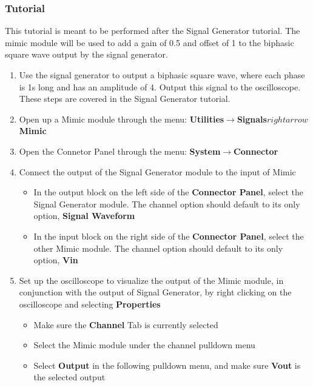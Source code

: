 \subsubsection{Tutorial}
\label{mimic tutorial}
This tutorial is meant to be performed after the Signal Generator tutorial. The mimic module will be used to add a gain of 0.5 and offset of 1 to the biphasic square wave output by the signal generator.

\begin{enumerate}
\item Use the signal generator to output a biphasic square wave, where each phase is 1s long and has an amplitude of 4. Output this signal to the oscilloscope. These steps are covered in the Signal Generator tutorial. 
\item Open up a Mimic module through the menu: \textbf{Utilities}$\rightarrow$\textbf{Signals}$rightarrow$\textbf{Mimic}
\item Open the Connetor Panel through the menu: \textbf{System}$\rightarrow$\textbf{Connector}
\item Connect the output of the Signal Generator module to the input of Mimic
  \begin{itemize}
  \item In the output block on the left side of the \textbf{Connector Panel}, select the Signal Generator module. The channel option should default to its only option, \textbf{Signal Waveform}
  \item In the input block on the right side of the \textbf{Connector Panel}, select the other Mimic module. The channel option should default to its only option, \textbf{Vin}
  \end{itemize}
\item Set up the oscilloscope to visualize the output of the Mimic module, in conjunction with the output of Signal Generator,  by right clicking on the oscilloscope and selecting \textbf{Properties}
  \begin{itemize}
  \item Make sure the \textbf{Channel} Tab is currently selected
  \item Select the Mimic module under the channel pulldown menu
  \item Select \textbf{Output} in the following pulldown menu, and make sure \textbf{Vout} is the selected output

\end{itemize}
\end{enumerate}

